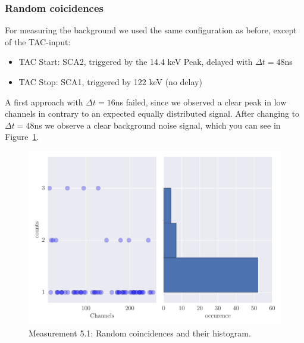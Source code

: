 \subsubsection{Random coicidences}
\label{ssub:Random coicidences}
For measuring the background we used the same configuration as before, except of the TAC-input:
\begin{itemize}
    \item TAC Start: SCA2, triggered by the 14.4 keV Peak, delayed with $\Delta t = 48$ns
    \item TAC Stop: SCA1, triggered by 122 keV (no delay)
\end{itemize}
A first approach with $\Delta t = 16$ns failed, since we observed a clear peak in low channels in contrary
to an expected equally distributed signal. After changing to $\Delta t=48$ns we observe a clear
background noise signal, which you can see in Figure~\ref{fig:5_1}.
\begin{figure}[htpb]
    \centering
    \includegraphics[width=1.0\linewidth]{analysis/figures/plot5_1_hist}
    \caption{Measurement 5.1: Random coincidences and their histogram.}
    \label{fig:5_1}
\end{figure}

\clearpage
